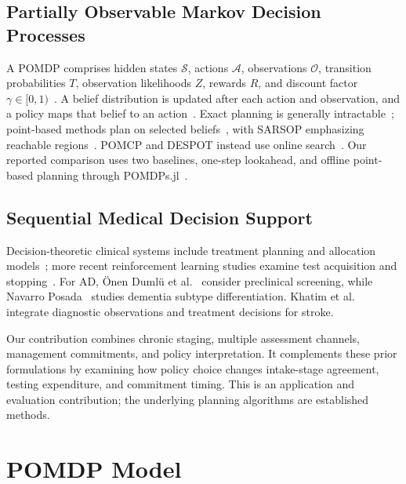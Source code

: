 \documentclass[conference,a4paper]{IEEEtran}
\begin{document}
\subsection{Partially Observable Markov Decision Processes}
\label{subsec:pomdp}
A POMDP comprises hidden states $\mathcal{S}$, actions $\mathcal{A}$,
observations $\mathcal{O}$, transition probabilities $T$, observation
likelihoods $Z$, rewards $R$, and discount factor
$\gamma\in[0,1)$~\cite{kaelbling,smallwood}. A belief distribution is
updated after each action and observation, and a policy maps that
belief to an action~\cite{monahan}. Exact planning is generally
intractable~\cite{cassandra}; point-based methods plan on selected
beliefs~\cite{pineau}, with SARSOP emphasizing reachable
regions~\cite{kurniawati}. POMCP and DESPOT instead use online
search~\cite{silver,ye}. Our reported comparison uses two baselines,
one-step lookahead, and offline point-based planning through
POMDPs.jl~\cite{egorov2017pomdps}.

\subsection{Sequential Medical Decision Support}
\label{subsec:medical}
Decision-theoretic clinical systems include treatment planning and
allocation models~\cite{hauskrecht,ahn}; more recent reinforcement
learning studies examine test acquisition and
stopping~\cite{yu2023drl,bernardino2022rl,meng2025costeffective}.
For AD, {\"O}nen Duml{\"u} et al.~\cite{onendumlu} consider
preclinical screening, while Navarro Posada~\cite{navarro} studies
dementia subtype differentiation. Khatim et al.~\cite{khatim}
integrate diagnostic observations and treatment decisions for stroke.

Our contribution combines chronic staging, multiple assessment
channels, management commitments, and policy interpretation.
It complements these prior formulations by examining how policy
choice changes intake-stage agreement, testing expenditure, and
commitment timing. This is an application and evaluation contribution;
the underlying planning algorithms are established methods.

\section{POMDP Model}
\end{document}
